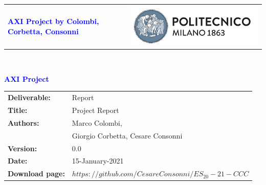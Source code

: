 




\begin{titlepage}


{\begin{table}[t!]
\centering
\begin{tabu} to \textwidth { X[1.3,r,p] X[1.7,l,p] }
\textcolor{Blue}
{\textbf{\small{AXI Project by Colombi, Corbetta, Consonni}}} & \includegraphics[scale=0.5]{./../../img/Images/PolimiLogo}
\end{tabu}
\end{table}}~\\ [7cm]


\begin{flushleft}

{\textcolor{Blue}{\textbf{\Huge{AXI Project}}}} \\ [1cm]

\end{flushleft}

\end{titlepage}

\begin{table}[h!]
\begin{tabu} to \textwidth { X[0.3,r,p] X[0.7,l,p] }
\hline

\textbf{Deliverable:} & Report\\
\textbf{Title:} & Project Report \\
\textbf{Authors:} & Marco Colombi, \\ & Giorgio Corbetta, Cesare Consonni \\
\textbf{Version:} & 0.0 \\
\textbf{Date:} & 15-January-2021 \\
\textbf{Download page:} & $https://github.com/CesareConsonni/ES_20-21-CCC$ \\
\hline
\end{tabu}
\end{table}




